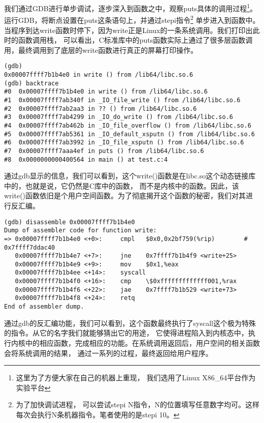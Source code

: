 我们通过GDB进行单步调试，逐步深入到函数之中，观察puts具体的调用过程\footnote{这里为了方便大家在自己的机器上重现，
我们选用了Linux X86\_64平台作为实验平台}。运行GDB，将断点设置在puts这条语句上，并通过stepi指令\footnote{为了加快调试进程，
可以尝试stepi N指令，N的位置填写任意数字均可。这样每次会执行N条机器指令。笔者使用的是stepi 10。}
单步进入到函数中。当程序到达write函数时停下，因为write正是Linux的一条系统调用。我们打印出此时的函数调用栈，
可以看出，C标准库中的puts函数实际上通过了很多层函数调用，最终调用到了底层的write函数进行真正的屏幕打印操作。

\begin{verbatim}
(gdb)
0x00007ffff7b1b4e0 in write () from /lib64/libc.so.6
(gdb) backtrace
#0  0x00007ffff7b1b4e0 in write () from /lib64/libc.so.6
#1  0x00007ffff7ab340f in _IO_file_write () from /lib64/libc.so.6
#2  0x00007ffff7ab2aa3 in ?? () from /lib64/libc.so.6
#3  0x00007ffff7ab4299 in _IO_do_write () from /lib64/libc.so.6
#4  0x00007ffff7ab462b in _IO_file_overflow () from /lib64/libc.so.6
#5  0x00007ffff7ab5361 in _IO_default_xsputn () from /lib64/libc.so.6
#6  0x00007ffff7ab3992 in _IO_file_xsputn () from /lib64/libc.so.6
#7  0x00007ffff7aaa4ef in puts () from /lib64/libc.so.6
#8  0x0000000000400564 in main () at test.c:4
\end{verbatim}

通过gdb显示的信息，我们可以看到，这个write()函数是在libc.so这个动态链接库中的，也就是说，它仍然是C库中的函数，
而不是内核中的函数。因此，该write()函数依旧是个用户空间函数。为了彻底揭开这个函数的秘密，我们对其进行反汇编。

\begin{verbatim}
(gdb) disassemble 0x00007ffff7b1b4e0
Dump of assembler code for function write:
=> 0x00007ffff7b1b4e0 <+0>:     cmpl   $0x0,0x2bf759(%rip)        # 0x7ffff7ddac40
   0x00007ffff7b1b4e7 <+7>:     jne    0x7ffff7b1b4f9 <write+25>
   0x00007ffff7b1b4e9 <+9>:     mov    $0x1,%eax
   0x00007ffff7b1b4ee <+14>:    syscall
   0x00007ffff7b1b4f0 <+16>:    cmp    \$0xfffffffffffff001,%rax
   0x00007ffff7b1b4f6 <+22>:    jae    0x7ffff7b1b529 <write+73>
   0x00007ffff7b1b4f8 <+24>:    retq
End of assembler dump.
\end{verbatim}

通过gdb的反汇编功能，我们可以看到，这个函数最终执行了syscall这个极为特殊的指令。从它的名字我们就能够猜出它的用途，
它使得进程陷入到内核态中，执行内核中的相应函数，完成相应的功能。在系统调用返回后，用户空间的相关函数会将系统调用的结果，
通过一系列的过程，最终返回给用户程序。

